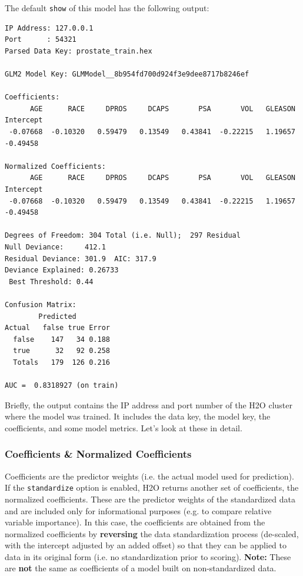 \documentclass{article}[11pt]
\begin{document}
The default \texttt{show} of this model has the following output:

\begin{verbatim}
IP Address: 127.0.0.1 
Port      : 54321 
Parsed Data Key: prostate_train.hex 

GLM2 Model Key: GLMModel__8b954fd700d924f3e9dee8717b8246ef

Coefficients:
      AGE      RACE     DPROS     DCAPS       PSA       VOL   GLEASON Intercept 
 -0.07668  -0.10320   0.59479   0.13549   0.43841  -0.22215   1.19657  -0.49458 

Normalized Coefficients:
      AGE      RACE     DPROS     DCAPS       PSA       VOL   GLEASON Intercept 
 -0.07668  -0.10320   0.59479   0.13549   0.43841  -0.22215   1.19657  -0.49458 

Degrees of Freedom: 304 Total (i.e. Null);  297 Residual
Null Deviance:     412.1
Residual Deviance: 301.9  AIC: 317.9
Deviance Explained: 0.26733 
 Best Threshold: 0.44

Confusion Matrix:
        Predicted
Actual   false true Error
  false    147   34 0.188
  true      32   92 0.258
  Totals   179  126 0.216

AUC =  0.8318927 (on train) 
\end{verbatim}

Briefly, the output contains the IP address and port number of the H2O cluster where the model was trained. It includes the data key, the model key, the coefficients, and  some model metrics. Let's look at these in detail.

\subsubsection{Coefficients \& Normalized Coefficients}
Coefficients are the predictor weights (i.e. the actual model used for prediction).  If the \texttt{standardize} option is enabled, H2O returns another set of coefficients, the normalized coefficients. These are the predictor weights of the standardized data and are included only for informational purposes (e.g. to compare relative variable importance). In this case, the coefficients are obtained from the normalized coefficients by \textbf{reversing} the data standardization process (de-scaled, with the intercept adjusted by an added offset) so that they can be applied to data in its original form (i.e. no standardization prior to scoring). \textbf{Note:} These are \textbf{not} the same as coefficients of a model built on non-standardized data.
\end{document}
